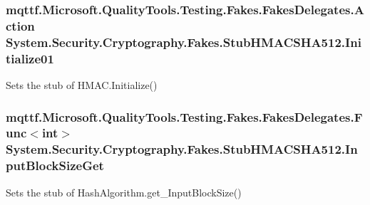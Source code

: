 \hypertarget{class_system_1_1_security_1_1_cryptography_1_1_fakes_1_1_stub_h_m_a_c_s_h_a512_a1c006ba4738859b0c43e48c26c64848d}{
\subsubsection[{Initialize01}]{\setlength{\rightskip}{0pt plus 5cm}mqttf.\-Microsoft.\-Quality\-Tools.\-Testing.\-Fakes.\-Fakes\-Delegates.\-Action System.\-Security.\-Cryptography.\-Fakes.\-Stub\-H\-M\-A\-C\-S\-H\-A512.\-Initialize01}}\label{class_system_1_1_security_1_1_cryptography_1_1_fakes_1_1_stub_h_m_a_c_s_h_a512_a1c006ba4738859b0c43e48c26c64848d}


Sets the stub of H\-M\-A\-C.\-Initialize()

\hypertarget{class_system_1_1_security_1_1_cryptography_1_1_fakes_1_1_stub_h_m_a_c_s_h_a512_a490b1d22fbebcfeb2227cc9dafea2489}{
\subsubsection[{Input\-Block\-Size\-Get}]{\setlength{\rightskip}{0pt plus 5cm}mqttf.\-Microsoft.\-Quality\-Tools.\-Testing.\-Fakes.\-Fakes\-Delegates.\-Func$<$int$>$ System.\-Security.\-Cryptography.\-Fakes.\-Stub\-H\-M\-A\-C\-S\-H\-A512.\-Input\-Block\-Size\-Get}}\label{class_system_1_1_security_1_1_cryptography_1_1_fakes_1_1_stub_h_m_a_c_s_h_a512_a490b1d22fbebcfeb2227cc9dafea2489}


Sets the stub of Hash\-Algorithm.\-get\-\_\-\-Input\-Block\-Size()

